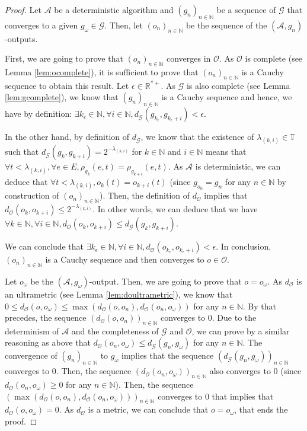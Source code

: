 \documentclass[11pt]{article}
\begin{document}
\begin{proof}
Let $\mathcal{A}$ be a deterministic algorithm and $(g_n)_{n\in\mathbb{N}}$ be a sequence of $\mathcal{G}$ that converges to a given $g_\omega\in\mathcal{G}$. Then, let $(o_n)_{n\in\mathbb{N}}$ be the sequence of the $(\mathcal{A},g_n)$-outputs.

First, we are going to prove that $(o_n)_{n\in\mathbb{N}}$ converges in $\mathcal{O}$. As $\mathcal{O}$ is complete (see Lemma \ref{lem:ocomplete}), it is sufficient to prove that $(o_n)_{n\in\mathbb{N}}$ is a Cauchy sequence to obtain this result. Let $\epsilon\in\mathbb{R}^{*+}$. As $\mathcal{G}$ is also complete (see Lemma \ref{lem:gcomplete}), we know that $(g_n)_{n\in\mathbb{N}}$ is a Cauchy sequence and hence, we have by definition: $\exists k_\epsilon\in\mathbb{N}, \forall i\in\mathbb{N}, d_\mathcal{G}(g_{k_\epsilon},g_{k_\epsilon+i})<\epsilon$. 

In the other hand, by definition of $d_\mathcal{G}$, we know that the existence of $\lambda_{(k,i)}\in\mathbb{T}$ such that $d_\mathcal{G}(g_k,g_{k+i})=2^{-\lambda_{(k,i)}}$ for $k\in\mathbb{N}$ and $i\in\mathbb{N}$ means that $\forall t<\lambda_{(k,i)},\forall e\in E,\rho_{g_k}(e,t)=\rho_{g_{k+i}}(e,t)$. As $\mathcal{A}$ is deterministic, we can deduce that $\forall t<\lambda_{(k,i)},o_k(t)=o_{k+i}(t)$ (since $g_{o_n}=g_n$ for any $n\in\mathbb{N}$ by construction of $(o_n)_{n\in\mathbb{N}}$). Then, the definition of $d_\mathcal{O}$ implies that $d_\mathcal{O}(o_k,o_{k+i})\leq 2^{-\lambda_{(k,i)}}$. In other words, we can deduce that we have $\forall k\in\mathbb{N}, \forall i\in\mathbb{N},d_\mathcal{O}(o_k,o_{k+i})\leq d_\mathcal{G}(g_k,g_{k+i})$.

We can conclude that $\exists k_\epsilon\in\mathbb{N}, \forall i\in\mathbb{N}, d_\mathcal{O}(o_{k_\epsilon},o_{k_\epsilon+i})<\epsilon$. In conclusion, $(o_n)_{n\in\mathbb{N}}$ is a Cauchy sequence and then converges to $o\in\mathcal{O}$.

Let $o_\omega$ be the $(\mathcal{A},g_\omega)$-output. Then, we are going to prove that $o=o_\omega$. As $d_\mathcal{O}$ is an ultrametric (see Lemma \ref{lem:doultrametric}), we know that $0\leq d_\mathcal{O}(o,o_\omega) \leq \max(d_\mathcal{O}(o, o_n), d_\mathcal{O}(o_n, o_\omega))$ for any $n\in\mathbb{N}$. By that precedes, the sequence $(d_\mathcal{O}(o, o_n))_{n\in\mathbb{N}}$ converges to $0$. Due to the determinism of $\mathcal{A}$ and the completeness of $\mathcal{G}$ and $\mathcal{O}$, we can prove by a similar reasoning as above that $d_\mathcal{O}(o_n,o_\omega) \leq d_\mathcal{G}(g_n, g_\omega)$ for any $n\in\mathbb{N}$. The convergence of $(g_n)_{n\in\mathbb{N}}$ to $g_\omega$ implies that the sequence $(d_\mathcal{G}(g_n, g_\omega))_{n\in\mathbb{N}}$ converges to $0$. Then, the sequence $(d_\mathcal{O}(o_n, o_\omega))_{n\in\mathbb{N}}$ also converges to $0$ (since $d_\mathcal{O}(o_n,o_\omega)\geq 0$ for any $n\in\mathbb{N}$). Then, the sequence $(\max(d_\mathcal{O}(o, o_n), d_\mathcal{O}(o_n, o_\omega)))_{n\in\mathbb{N}}$ converges to $0$ that implies that $d_\mathcal{O}(o,o_\omega)=0$. As $d_\mathcal{O}$ is a metric, we can conclude that $o=o_\omega$, that ends the proof.
\end{proof}
\end{document}
